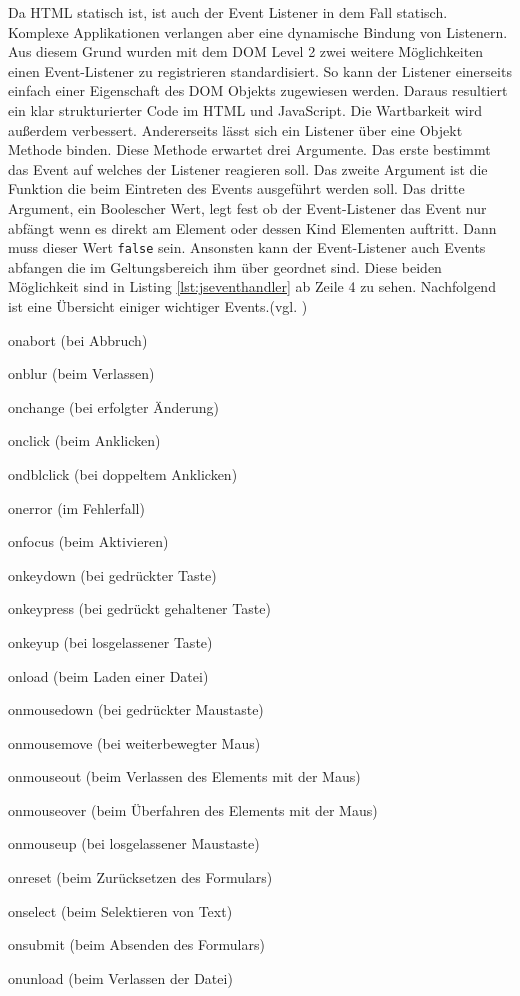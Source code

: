 Da HTML statisch ist, ist auch der Event Listener in dem Fall statisch. Komplexe Applikationen verlangen aber eine dynamische Bindung von Listenern. Aus diesem Grund wurden mit dem DOM Level 2 zwei weitere Möglichkeiten einen Event-Listener zu registrieren standardisiert. So kann der Listener einerseits einfach einer Eigenschaft des DOM Objekts zugewiesen werden. Daraus resultiert ein klar strukturierter Code im HTML und JavaScript. Die Wartbarkeit wird außerdem verbessert. Andererseits lässt sich ein Listener über eine Objekt Methode binden. Diese Methode erwartet drei Argumente. Das erste bestimmt das Event auf welches der Listener reagieren soll. Das zweite Argument ist die Funktion die beim Eintreten des Events ausgeführt werden soll. Das dritte Argument, ein Boolescher Wert, legt fest ob der Event-Listener das Event nur abfängt wenn es direkt am Element oder dessen Kind Elementen auftritt. Dann muss dieser Wert \texttt{false} sein. Ansonsten kann der Event-Listener auch Events abfangen die im Geltungsbereich ihm über geordnet sind. Diese beiden Möglichkeit sind in Listing \ref{lst:jseventhandler} ab Zeile 4 zu sehen. Nachfolgend ist eine Übersicht einiger wichtiger Events.(vgl. \cite[S.428ff]{FlanJava2007})

\vspace{1em}
\begin{compactitem}
  \item onabort (bei Abbruch)
	\item onblur (beim Verlassen)
	\item onchange (bei erfolgter Änderung)
	\item onclick (beim Anklicken)
	\item ondblclick (bei doppeltem Anklicken)
	\item onerror (im Fehlerfall)
	\item onfocus (beim Aktivieren)
	\item onkeydown (bei gedrückter Taste)
	\item onkeypress (bei gedrückt gehaltener Taste)
	\item onkeyup (bei losgelassener Taste)
	\item onload (beim Laden einer Datei)
	\item onmousedown (bei gedrückter Maustaste)
	\item onmousemove (bei weiterbewegter Maus)
	\item onmouseout (beim Verlassen des Elements mit der Maus)
	\item onmouseover (beim Überfahren des Elements mit der Maus)
	\item onmouseup (bei losgelassener Maustaste)
	\item onreset (beim Zurücksetzen des Formulars)
	\item onselect (beim Selektieren von Text)
	\item onsubmit (beim Absenden des Formulars)
	\item onunload (beim Verlassen der Datei)
\end{compactitem}

